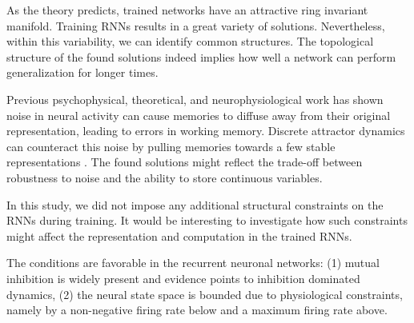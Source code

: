 \documentclass{article} %
\newcounter{ct}
\theoremstyle{definition}
\theoremstyle{remark}
\begin{document}
As the theory predicts, trained networks have an attractive ring invariant manifold.
Training RNNs results in a great variety of solutions.
 Nevertheless, within this variability, we can identify common structures.
The topological structure of the found solutions indeed implies how well a network can perform generalization for longer times.




Previous psychophysical, theoretical, and neurophysiological work has shown noise in neural activity can cause memories to diffuse away from their original representation, leading to errors in working memory.
Discrete attractor dynamics can counteract this noise by pulling memories towards a few stable representations \citep{panichello2019}.
The found solutions might reflect the trade-off between robustness to noise and the ability to store continuous variables.



In this study, we did not impose any additional structural constraints on the RNNs during training.
It would be interesting to investigate how such constraints might affect the representation and computation in the trained RNNs.



The conditions are favorable in the recurrent neuronal networks: (1) mutual inhibition is widely present and evidence points to inhibition dominated dynamics,
(2) the neural state space is bounded due to physiological constraints, namely by a non-negative firing rate below and a maximum firing rate above.





\end{document}
